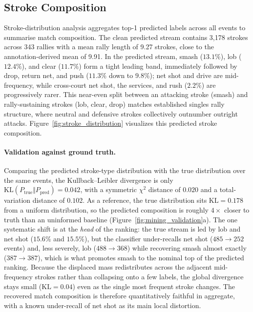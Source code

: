 \subsection{Stroke Composition}

Stroke-distribution analysis aggregates top-1 predicted labels across all events
to summarise match composition. The clean predicted stream contains 3{,}178
strokes across 343 rallies with a mean rally length of 9.27 strokes, close to
the annotation-derived mean of 9.91. In the predicted stream, smash ($13.1\%$),
lob ($12.4\%$), and clear ($11.7\%$) form a tight leading band, immediately
followed by drop, return net, and push ($11.3\%$ down to $9.8\%$); net shot and
drive are mid-frequency, while cross-court net shot, the services, and rush
($2.2\%$) are progressively rarer. This near-even split between an attacking
stroke (smash) and rally-sustaining strokes (lob, clear, drop) matches
established singles rally structure, where neutral and defensive strokes
collectively outnumber outright attacks.
Figure~\ref{fig:stroke_distribution} visualizes this predicted stroke
composition.

\paragraph{Validation against ground truth.}
Comparing the predicted stroke-type distribution with the true distribution over
the same events, the Kullback--Leibler divergence is only
$\mathrm{KL}(P_{\text{true}}\Vert P_{\text{pred}})=0.042$, with a symmetric
$\chi^2$ distance of $0.020$ and a total-variation distance of $0.102$. As a
reference, the true distribution sits $\mathrm{KL}=0.178$ from a uniform
distribution, so the predicted composition is roughly $4\times$ closer to truth
than an uninformed baseline (Figure~\ref{fig:mining_validation}a). The one
systematic shift is at the \emph{head} of the ranking: the true stream is led by
lob and net shot ($15.6\%$ and $15.5\%$), but the classifier under-recalls net
shot ($485\to252$ events) and, less severely, lob ($488\to368$) while recovering
smash almost exactly ($387\to387$), which is what promotes smash to the nominal
top of the predicted ranking. Because the displaced mass redistributes across the
adjacent mid-frequency strokes rather than collapsing onto a few labels, the
global divergence stays small ($\mathrm{KL}=0.04$) even as the single most
frequent stroke changes. The recovered match composition is therefore
quantitatively faithful in aggregate, with a known under-recall of net shot as
its main local distortion.

